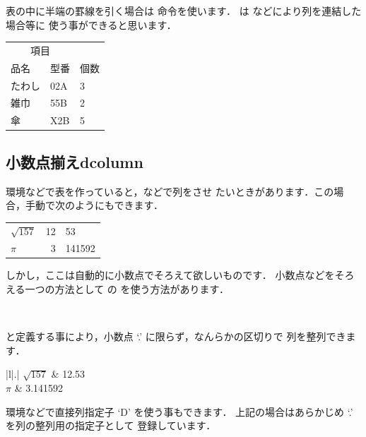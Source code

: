 表の中に半端の罫線を引く場合は  命令を使います．
 は  などにより列を連結した場合等に
使う事ができると思います．
\begin{InOut}
\usepackage{booktabs}
\begin{tabular}{lll}
 \toprule
 \multicolumn{2}{c}{項目} & \\
 \cmidrule{1-2}
 品名 & 型番 & 個数\\ \midrule
 たわし & 02A & 3 \\
 雑巾   & 55B & 2 \\
 傘     & X2B & 5 \\ \bottomrule
\end{tabular}
\end{InOut}

\subsection{小数点揃え\zdash\textsf{dcolumn}}
 環境などで表を作っていると，などで列をさせ
たいときがあります．この場合，手動で次のようにもできます．
\begin{InOut}
 \begin{center}
  \begin{tabular}{|l|r@{.}l|}
   $\sqrt{157}$   & 12 & 53 \\
   $\pi$ & 3 & 141592 \\
  \end{tabular}
 \end{center}
\end{InOut}
しかし，ここは自動的に小数点でそろえて欲しいものです．
小数点などをそろえる一つの方法として  の 
を使う方法があります．
\begin{Syntax}
 \\
\end{Syntax}
と定義する事により，小数点 `.' に限らず，なんらかの区切りで
列を整列できます．
\begin{InOut}
 \usepackage{dcolumn}
 \begin{center}
  \begin{tabular}{|l|.|}
   $\sqrt{157}$ & 12.53    \\
   $\pi$        & 3.141592 \\
  \end{tabular}
 \end{center}
\end{InOut}
%
 環境などで直接{列指定子} `D' を使う事もできます．
上記の場合はあらかじめ `.' を列の整列用の指定子として
登録しています．




